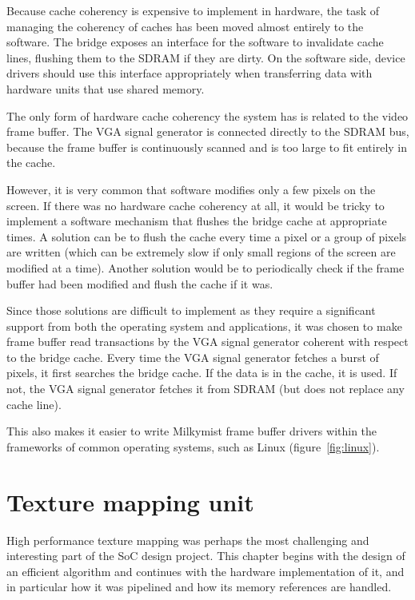 \documentclass[a4paper,11pt]{kthesis}
\begin{document}
Because cache coherency is expensive to implement in hardware, the task of managing the coherency of caches has been moved almost entirely to the software. The bridge exposes an interface for the software to invalidate cache lines, flushing them to the SDRAM if they are dirty. On the software side, device drivers should use this interface appropriately when transferring data with hardware units that use shared memory.

The only form of hardware cache coherency the system has is related to the video frame buffer. The VGA signal generator is connected directly to the SDRAM bus, because the frame buffer is continuously scanned and is too large to fit entirely in the cache.

However, it is very common that software modifies only a few pixels on the screen. If there was no hardware cache coherency at all, it would be tricky to implement a software mechanism that flushes the bridge cache at appropriate times. A solution can be to flush the cache every time a pixel or a group of pixels are written (which can be extremely slow if only small regions of the screen are modified at a time). Another solution would be to periodically check if the frame buffer had been modified and flush the cache if it was.

Since those solutions are difficult to implement as they require a significant support from both the operating system and applications, it was chosen to make frame buffer read transactions by the VGA signal generator coherent with respect to the bridge cache. Every time the VGA signal generator fetches a burst of pixels, it first searches the bridge cache. If the data is in the cache, it is used. If not, the VGA signal generator fetches it from SDRAM (but does not replace any cache line).

This also makes it easier to write Milkymist frame buffer drivers within the frameworks of common operating systems, such as Linux (figure~\ref{fig:linux}).

\chapter{Texture mapping unit}
\label{ch:tmu}
High performance texture mapping was perhaps the most challenging and interesting part of the SoC design project. This chapter begins with the design of an efficient algorithm and continues with the hardware implementation of it, and in particular how it was pipelined and how its memory references are handled.
\end{document}
